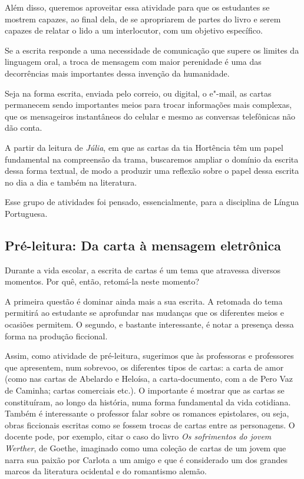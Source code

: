\documentclass[12pt]{extarticle}
\begin{document}
Além disso, queremos aproveitar essa atividade para que os estudantes se
mostrem capazes, ao final dela, de se apropriarem de partes do livro e
serem capazes de relatar o lido a um interlocutor, com um objetivo
específico.

Se a escrita responde a uma necessidade de comunicação que supere os
limites da linguagem oral, a troca de mensagem com maior perenidade é
uma das decorrências mais importantes dessa invenção da humanidade.

Seja na forma escrita, enviada pelo correio, ou digital, o e"-mail, as
cartas permanecem sendo importantes meios para trocar informações mais
complexas, que os mensageiros instantâneos do celular e mesmo as
conversas telefônicas não dão conta.

A partir da leitura de \emph{Júlia}, em que as cartas da tia Hortência
têm um papel fundamental na compreensão da trama, buscaremos ampliar o
domínio da escrita dessa forma textual, de modo a produzir uma reflexão
sobre o papel dessa escrita no dia a dia e também na literatura.

Esse grupo de atividades foi pensado, essencialmente, para a disciplina
de Língua Portuguesa.


\subsection{Pré-leitura: Da carta à mensagem eletrônica}

Durante a vida escolar, a escrita de cartas é um tema que atravessa
diversos momentos. Por quê, então, retomá-la neste momento?

A primeira questão é dominar ainda mais a sua escrita. A retomada do
tema permitirá ao estudante se aprofundar nas mudanças que os diferentes
meios e ocasiões permitem. O segundo, e bastante interessante, é notar a
presença dessa forma na produção ficcional.

Assim, como atividade de pré-leitura, sugerimos que às professoras e
professores que apresentem, num sobrevoo, os diferentes tipos de cartas:
a carta de amor (como nas cartas de Abelardo e Heloísa, a
carta-documento, com a de Pero Vaz de Caminha; cartas comerciais etc.).
O importante é mostrar que as cartas se constituíram, ao longo da
história, numa forma fundamental da vida cotidiana. Também é
interessante o professor falar sobre os romances epistolares, ou seja,
obras ficcionais escritas como se fossem trocas de cartas entre as
personagens. O docente pode, por exemplo, citar o caso do livro \emph{Os
sofrimentos do jovem Werther}, de Goethe, imaginado como uma coleção de
cartas de um jovem que narra sua paixão por Carlota a um amigo e que é
considerado um dos grandes marcos da literatura ocidental e do
romantismo alemão.
\end{document}
